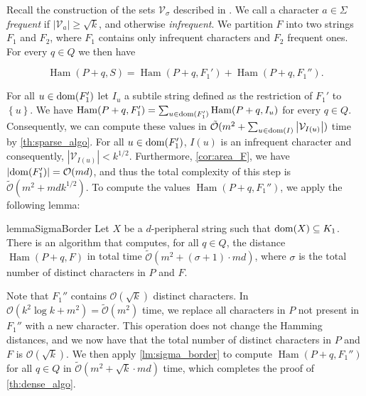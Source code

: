 \documentclass[11pt, letterpaper]{article}
\theoremstyle{plain}
\theoremstyle{definition}
\theoremstyle{remark}
\renewcommand{\O}{\mathcal{O}}
\newcommand{\tO}{\tilde{\mathcal{O}}}
\newcommand{\V}{\mathcal{V}}
\newcommand{\set}[1]{\left\lbrace #1 \right\rbrace}
\DeclareMathOperator*{\Ham}{Ham}
\newcommand{\absolute}[1]{\left\lvert#1\right\rvert}
\begin{document}
Recall the construction of the sets $\V_\sigma$ described in . We call a character $a \in \Sigma$ \emph{frequent} if $\absolute{\V_a} \ge \sqrt{k}$, and otherwise \emph{infrequent}. We partition $F$ into two strings $F_1$ and $F_2$, where $F_1$ contains only infrequent characters and $F_2$ frequent ones. For every $q \in Q$ we then have 

\[\Ham(P + q, S) = \Ham(P + q, F_1') + \Ham(P + q, F_1'').\]

For all $u \in \operatorname*{dom}(F_1')$ let $I_u$ a subtile string defined as the restriction of $F_1'$ to $\set{u}$. We have $\Ham(P + q, F_1') = \sum_{u \in \d{F_1'}} \Ham(P + q, I_u)$ for every $q \in Q$. Consequently, we can compute these values in $\tO(m^2 + \sum_{u \in \d{I}} \absolute{\V_{I(u)}})$ time by \cref{th:sparse_algo}. For all $u \in \operatorname*{dom}(F_1')$, $I(u)$ is an infrequent character and consequently, $\absolute{\V_{I(u)}} < k^{1/2}$. Furthermore, \cref{cor:area_F}, we have $\absolute{\d{F_1'}} = \O(md)$, and thus the total complexity of this step is $\tO(m^2 + mdk^{1/2})$. 
To compute the values $\Ham(P + q, F_1'')$, we apply the following lemma:

\begin{restatable}{lemma}{SigmaBorder}\label{lm:sigma_border}
Let $X$ be a $d$-peripheral string such that $\operatorname*{dom}(X) \subseteq K_1$. There is an algorithm that computes, for all $q \in Q$, the distance $\Ham(P + q, F)$ in total time $\tO(m^2 + (\sigma+1) \cdot md)$, where $\sigma$ is the total number of distinct characters in $P$ and $F$.
\end{restatable}

Note that $F_1''$ contains $\O(\sqrt{k})$ distinct characters. In $\O(k^2 \log k + m^2) = \tO(m^2)$ time, we replace all characters in $P$ not present in $F_1''$ with a new character. This operation does not change the Hamming distances, and we now have that the total number of distinct characters in $P$ and $F$ is $\O(\sqrt{k})$. We then apply \cref{lm:sigma_border} to compute $\Ham(P + q, F_1'')$ for all $q \in Q$ in $\tO(m^2 + \sqrt k \cdot md)$ time, which completes the proof of \ref{th:dense_algo}. 
\end{document}
